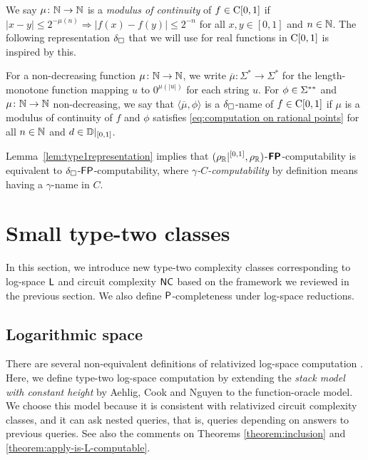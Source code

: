 \documentclass[envcountsame,orivec,oribibl]{llncs}
\begin{document}
We say $\mu \colon \mathbb N \to \mathbb N$ is a {\em modulus of continuity} of $f \in \mathrm C[0,1]$
if $|x - y| \le 2^{-\mu(n)} \Rightarrow |f(x) - f(y)| \le 2^{-n}$ for all $x, y \in [0,1]$ and $n \in \mathbb N$.
The following representation $\delta _\square$ that we will use for real functions in $\mathrm C[0,1]$ 
is inspired by this. 

For a non-decreasing function $\mu \colon \mathbb N \to \mathbb N$, 
we write $\overline \mu \colon \Sigma^* \to \Sigma^*$ for the length-monotone
function mapping $u$ to $0^{\mu(|u|)}$ for each string $u$.
For $\phi \in \Sigma ^{**}$ and $\mu \colon \mathbb N \to \mathbb N$ non-decreasing,
we say that $\langle \overline{\mu}, \phi \rangle$ is a $\delta _\square$-name of $f \in \mathrm C[0,1]$
if $\mu$ is a modulus of continuity of $f$
and $\phi$ satisfies \eqref{eq:computation on rational points}
for all $n \in \mathbb N$ and $d \in \mathbb D|_{[0,1]}$.

Lemma~\ref{lem:type1representation} implies that
$(\rho _\mathbb R|^{[0,1]},\rho _\mathbb R)$-$\text{\bfseries \sffamily \upshape FP}$-computability is equivalent to 
$\delta _\square$-$\mathsf{FP}$-computability,
where \emph{$\gamma$-$C$-computability} by definition means 
having a $\gamma$-name in $C$.


\section{Small type-two classes}
\label{section:small-classes}

In this section, we introduce new type-two complexity classes
corresponding to log-space $\mathsf{L}$ and circuit complexity $\mathsf{NC}$
based on the framework we reviewed in the previous section.
We also define $\mathsf{P}$-completeness under log-space reductions.

\subsection{Logarithmic space}
There are several non-equivalent definitions of 
relativized log-space computation
\cite{aehlig2007relativizing,buss1988relativized,ladner1976relativization,wilson1988measure}.
Here, we define type-two log-space computation 
by extending the {\em stack model with constant height} 
by Aehlig, Cook and Nguyen \cite{aehlig2007relativizing} to the 
function-oracle model.
We choose this model because it is consistent with relativized circuit complexity classes, 
and it can ask nested queries, that is, queries depending on answers to previous queries.
See also the comments on Theorems \ref{theorem:inclusion} and \ref{theorem:apply-is-L-computable}.
\end{document}
